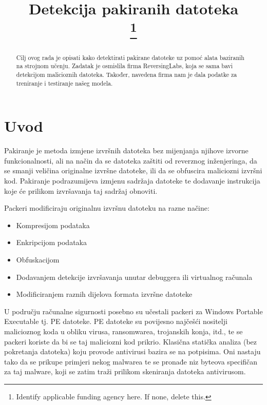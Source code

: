 \documentclass[conference]{IEEEtran}
\begin{document}
\title{Detekcija pakiranih datoteka\\
\thanks{Identify applicable funding agency here. If none, delete this.}
}
\author{
}

\maketitle

\begin{abstract}
Cilj ovog rada je opisati kako detektirati pakirane datoteke uz pomoć alata baziranih na strojnom učenju. Zadatak je osmislila firma ReversingLabs, koja se sama bavi detekcijom malicioznih datoteka. Također, navedena firma nam je dala podatke za treniranje i testiranje našeg modela.
\end{abstract}



\section{Uvod}
Pakiranje je metoda izmjene izvršnih datoteka bez mijenjanja njihove izvorne funkcionalnosti,
ali na način da se datoteka zaštiti od reverznog inženjeringa, da se smanji veličina originalne
izvršne datoteke, ili da se obfuscira maliciozni izvršni kod. Pakiranje podrazumijeva izmjenu
sadržaja datoteke te dodavanje instrukcija koje će prilikom izvršavanja taj sadržaj obnoviti.

Packeri 
modificiraju originalnu izvršnu datoteku na razne načine:
\begin{itemize}
\item Kompresijom podataka
\item Enkripcijom podataka
\item Obfuskacijom
\item Dodavanjem detekcije izvršavanja unutar debuggera ili virtualnog računala
\item Modificiranjem raznih dijelova formata izvršne datoteke
\end{itemize}

U području računalne sigurnosti posebno su učestali packeri za Windows Portable Executable tj. PE datoteke.
PE datoteke su povijesno najčešći nositelji malicioznog koda u 
obliku virusa, ransomwarea, trojanskih konja, itd., te se packeri koriste da bi se taj maliciozni kod prikrio. Klasična statička analiza 
(bez pokretanja datoteka) koju provode antivirusi bazira se na potpisima.
Oni nastaju tako da se prikupe primjeri nekog malwarea te se pronađe niz byteova specifičan za taj malware, 
koji se zatim traži prilikom skeniranja datoteka antivirusom.
\end{document}
